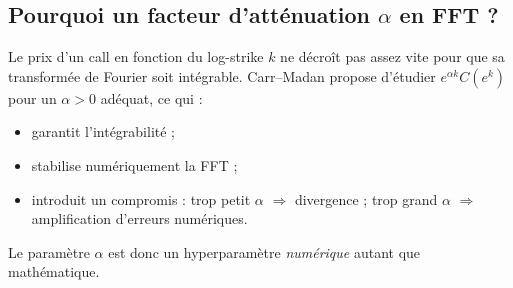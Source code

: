 \documentclass[11pt,a4paper]{report}
\theoremstyle{definition}
\theoremstyle{plain}
\theoremstyle{remark}
\newcommand{\1}{\mathbf{1}}
\begin{document}
\subsection*{Pourquoi un facteur d'atténuation $\alpha$ en FFT ?}
Le prix d'un call en fonction du log-strike $k$ ne décroît pas assez vite pour que sa transformée de Fourier soit intégrable.
Carr--Madan propose d'étudier $e^{\alpha k}C(e^k)$ pour un $\alpha>0$ adéquat, ce qui :
\begin{itemize}[leftmargin=*]
\item garantit l'intégrabilité ;
\item stabilise numériquement la FFT ;
\item introduit un compromis : trop petit $\alpha$ $\Rightarrow$ divergence ; trop grand $\alpha$ $\Rightarrow$ amplification d'erreurs numériques.
\end{itemize}
Le paramètre $\alpha$ est donc un hyperparamètre \emph{numérique} autant que mathématique.


\end{document}
